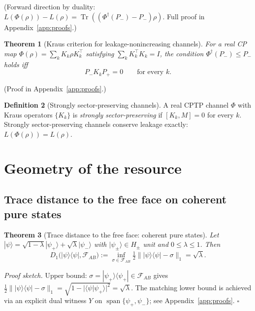 \documentclass[a4paper,onecolumn,noarxiv]{quantumarticle}
\theoremstyle{plain}
\newtheorem{theorem}{Theorem}
\theoremstyle{definition}
\newtheorem{definition}[theorem]{Definition}
\theoremstyle{remark}
\newcommand{\Pplus}{P_{+}}
\newcommand{\Pminus}{P_{-}}
\newcommand{\Mop}{M}
\newcommand{\FAB}{\mathcal{F}_{AB}}
\newcommand{\Tr}{\operatorname{Tr}}
\newcommand{\Phid}{\Phi^{\dagger}}
\newcommand{\Lleak}{L}
\begin{document}
(Forward direction by duality: $\Lleak(\Phi(\rho))-\Lleak(\rho)=
\Tr((\Phid(\Pminus)-\Pminus)\rho)$. Full proof in Appendix~\ref{app:proofs}.)

\begin{theorem}[Kraus criterion for leakage-nonincreasing channels]
\label{thm:kraus}
For a real CP map $\Phi(\rho)=\sum_k K_k\rho K_k^\top$ satisfying
$\sum_k K_k^\top K_k=I$, the condition $\Phid(\Pminus)\le\Pminus$ holds iff
\begin{equation}
  \Pminus K_k\Pplus = 0 \qquad\text{for every }k.
\end{equation}
\end{theorem}

(Proof in Appendix~\ref{app:proofs}.)

\begin{definition}[Strongly sector-preserving channels]
\label{def:sector-preserving}
A real CPTP channel $\Phi$ with Kraus operators $\{K_k\}$ is \emph{strongly
sector-preserving} if $[K_k,\Mop]=0$ for every $k$. Strongly sector-preserving
channels conserve leakage exactly: $\Lleak(\Phi(\rho))=\Lleak(\rho)$.
\end{definition}

\section{Geometry of the resource}
\label{sec:geometry}

\subsection{Trace distance to the free face on coherent pure states}

\begin{theorem}[Trace distance to the free face: coherent pure states]
\label{thm:tracedist}
Let $|\psi\rangle=\sqrt{1-\lambda}|\psi_+\rangle+\sqrt{\lambda}|\psi_-\rangle$ with
$|\psi_\pm\rangle\in H_\pm$ unit and $0\le\lambda\le 1$. Then
\begin{equation}
  D_1\bigl(|\psi\rangle\langle\psi|,\FAB\bigr)
  := \inf_{\sigma\in\FAB}\tfrac{1}{2}\bigl\||\psi\rangle\langle\psi|-\sigma\bigr\|_1
  = \sqrt{\lambda}.
\end{equation}
\end{theorem}

\emph{Proof sketch.} Upper bound: $\sigma=|\psi_+\rangle\langle\psi_+|\in\FAB$ gives
$\tfrac{1}{2}\||\psi\rangle\langle\psi|-\sigma\|_1
=\sqrt{1-|\langle\psi|\psi_+\rangle|^2}=\sqrt{\lambda}$. The matching lower bound is
achieved via an explicit dual witness $Y$ on $\operatorname{span}\{\psi_+,\psi_-\}$;
see Appendix~\ref{app:proofs}. \hfill$\square$
\end{document}
